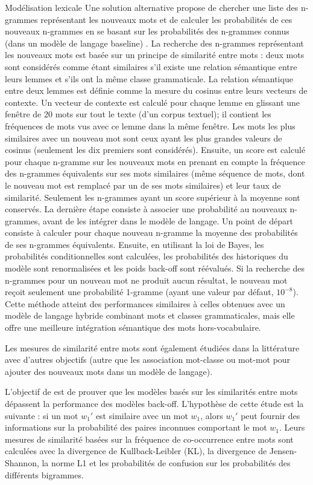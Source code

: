 \documentclass{style/these}
\let\oldcite=\cite
\renewcommand{\cite}[1]{{\fontfamily{qcs}\selectfont{\color{darkerblue}[\oldcite{#1}]}}}
\begin{document}
\begin{part}{Modélisation lexicale}
Une solution alternative propose de chercher une liste des n-grammes représentant les nouveaux mots et de calculer les probabilités de ces nouveaux n-grammes en se basant sur les probabilités des n-grammes connus (dans un modèle de langage baseline) \cite{Lecorve:2011}. 
La recherche des n-grammes représentant les nouveaux mots est basée sur un principe de similarité entre mots : deux mots sont considérés comme étant similaires s'il existe une relation sémantique entre leurs lemmes et s'ils ont la même classe grammaticale. 
La relation sémantique entre deux lemmes est définie comme la mesure du cosinus entre leurs vecteurs de contexte.
Un vecteur de contexte est calculé pour chaque lemme en glissant une fenêtre de 20 mots sur tout le texte (d'un corpus textuel); il contient les fréquences de mots vus avec ce  lemme dans la même fenêtre. 
Les mots les plus similaires avec un nouveau mot sont ceux ayant les plus grandes valeurs de cosinus (seulement les dix premiers sont considérés). 
Ensuite, un score est calculé pour chaque n-gramme sur les nouveaux mots en prenant en compte la fréquence des n-grammes équivalents sur ses mots similaires (même séquence de mots, dont le nouveau mot est remplacé par un de ses mots similaires) et leur taux de similarité. 
Seulement les n-grammes ayant un score supérieur à la moyenne sont conservés. 
La dernière étape consiste à associer une probabilité au nouveaux n-grammes, avant de les intégrer dans le modèle de langage. 
Un point de départ consiste à calculer pour chaque nouveau n-gramme la moyenne des probabilités de ses n-grammes équivalents. 
Ensuite, en utilisant la loi de Bayes, les probabilités conditionnelles sont calculées, les probabilités des historiques du modèle sont renormalisées et les poids back-off sont réévalués. Si la recherche des n-grammes pour un nouveau mot ne produit aucun résultat, le nouveau mot reçoit seulement une probabilité 1-gramme (ayant une valeur par défaut, $10^{-8}$).
Cette méthode atteint des performances similaires à celles obtenues avec un modèle de langage hybride combinant mots et classes grammaticales, mais elle offre une meilleure intégration sémantique des mots hors-vocabulaire. 

Les mesures de similarité entre mots sont également étudiées dans la littérature avec d'autres objectifs (autre que les association mot-classe ou mot-mot pour ajouter des nouveaux mots dans un modèle de langage). 

L'objectif de \cite{Dagan:1999} est de prouver que les modèles basés sur les similarités entre mots dépassent la performance des modèles back-off. 
L'hypothèse de cette étude est la suivante : si un mot $w_1'$ est similaire avec un mot $w_1$, alors $w_1'$ peut fournir des informations sur la probabilité des paires inconnues comportant le mot $w_1$.
Leurs mesures de similarité basées sur la fréquence de co-occurrence entre mots sont calculées avec la divergence de Kullback-Leibler (KL), la divergence de Jensen-Shannon, la norme L1 et les probabilités de confusion sur les probabilités des différents bigrammes. 


\end{part}
\end{document}
